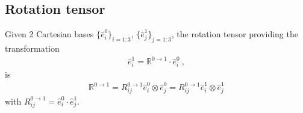 \documentclass[letterpaper,10pt,english]{jupyterBook}
\begin{document}
\subsection{Rotation tensor}
\label{\detokenize{ch/kinematics-rotations:rotation-tensor}}
\sphinxAtStartPar
Given 2 Cartesian bases \(\{ \hat{e}^0_i \}_{i=1:3}\), \(\{ \hat{e}^1_j \}_{j=1:3}\), the rotation tensor providing the transformation
\begin{equation*}
\begin{split}\hat{e}^1_i = \mathbb{R}^{0 \rightarrow 1} \cdot \hat{e}^0_i \ ,\end{split}
\end{equation*}
\sphinxAtStartPar
is
\begin{equation*}
\begin{split}\mathbb{R}^{0 \rightarrow 1}
 = R_{ij}^{0 \rightarrow 1} \hat{e}^0_i \otimes \hat{e}^0_j  
 = R_{ij}^{0 \rightarrow 1} \hat{e}^1_i \otimes \hat{e}^1_j 
\end{split}
\end{equation*}
\sphinxAtStartPar
with \(R^{0 \rightarrow 1}_{ij} = \hat{e}^0_i \cdot \hat{e}^1_j\).
\end{document}
